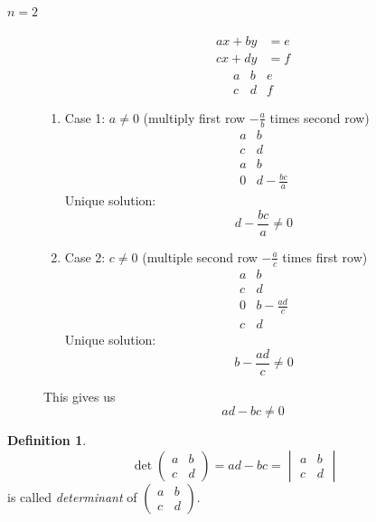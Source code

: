 \documentclass[a4paper,landscape,twocolumn]{article}
\theoremstyle{definition}
\newtheorem{defi}{Definition}
\begin{document}
\begin{description}
  \item[$n=2$]
    \begin{align*}
      ax + by &= e \\
      cx + dy &= f
    \end{align*}
    \[
      \begin{array}{cc|c}
        a & b & e \\
        c & d & f
      \end{array}
    \]
    \begin{enumerate}
      \item Case 1: $a \neq 0$ (multiply first row $-\frac{a}{b}$ times second row)
        \[
          \begin{array}{cc}
            a & b \\
            c & d \\
          \hline
            a & b \\
            0 & d - \frac{bc}{a}
          \end{array}
        \]
        Unique solution:
        \[ d - \frac{bc}{a} \neq 0 \]

      \item Case 2: $c \neq 0$ (multiple second row $-\frac{a}{c}$ times first row)
        \[
          \begin{array}{cc}
            a & b \\
            c & d \\
          \hline
            0 & b-\frac{ad}{c} \\
            c & d
          \end{array}
        \]
        Unique solution:
        \[ b - \frac{ad}{c} \neq 0 \]
    \end{enumerate}

    This gives us
    \[ ad - bc \neq 0 \]
\end{description}

\begin{defi}
  \[ \det\begin{pmatrix} a & b \\ c & d \end{pmatrix} = ad - bc = \begin{vmatrix} a & b \\ c & d \end{vmatrix} \]
  is called \emph{determinant} of $\begin{pmatrix} a & b \\ c & d \end{pmatrix}$.
\end{defi}
\end{document}
